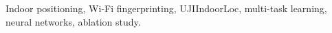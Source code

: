 \documentclass[conference]{IEEEtran}
\newcommand{\paperkeywords}{Indoor positioning, Wi-Fi fingerprinting,
  UJIIndoorLoc, multi-task learning, neural networks, ablation study}
\begin{document}
\begin{IEEEkeywords}
\paperkeywords.
\end{IEEEkeywords}












\end{document}
